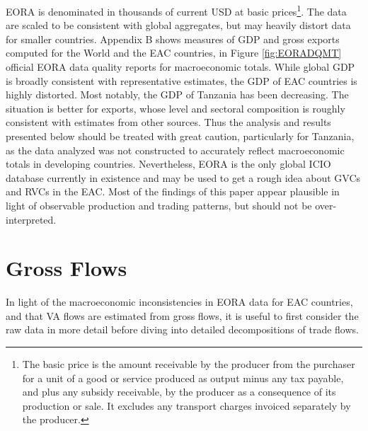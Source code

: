 \documentclass[a4paper]{article}
\begin{document}
 EORA is denominated in thousands of current USD at basic prices\footnote{The basic price is the amount receivable by the producer from the purchaser for a unit of a good or service produced as output minus any tax payable, and plus any subsidy receivable, by the producer as a consequence of its production or sale. It excludes any transport charges invoiced separately by the producer.}. The data are scaled to be consistent with global aggregates, but may heavily distort data for smaller countries. Appendix B shows measures of GDP and gross exports computed for the World and the EAC countries, in Figure \ref{fig:EORADQMT} official EORA data quality reports for macroeconomic totals. While global GDP is broadly consistent with representative estimates, the GDP of EAC countries is highly distorted. Most notably, the GDP of Tanzania has been decreasing. The situation is better for exports, whose level and sectoral composition is roughly consistent with estimates from other sources. Thus the analysis and results presented below should be treated with great caution, particularly for Tanzania, as the data analyzed was not constructed to accurately reflect macroeconomic totals in developing countries. Nevertheless, EORA is the only global ICIO database currently in existence and may be used to get a rough idea about GVCs and RVCs in the EAC. Most of the findings of this paper appear plausible in light of observable production and trading patterns, but should not be over-interpreted. 

\newpage


\section{Gross Flows}

In light of the macroeconomic inconsistencies in EORA data for EAC countries, and that VA flows are estimated from gross flows, it is useful to first consider the raw data in more detail before diving into detailed decompositions of trade flows. \newline
\end{document}
